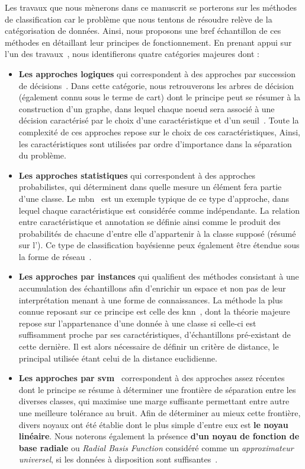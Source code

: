 Les travaux que nous mènerons dans ce manuscrit se porterons sur les méthodes de classification car le problème que nous tentons de résoudre relève de la catégorisation de données. Ainsi, nous proposons une bref échantillon de ces méthodes en détaillant leur principes de fonctionnement. En prenant appui sur l'un des travaux~\cite{Kotsiantis2007}, nous identifierons quatre catégories majeures dont :
\begin{itemize}
    \item \textbf{Les approches logiques} qui correspondent à des approches par succession de décisions~\cite{Kotsiantis2007}. Dans cette catégorie, nous retrouverons les arbres de décision~\cite{Breiman1984} (également connu sous le terme de \gls{cart}) dont le principe peut se résumer à la construction d'un graphe, dans lequel chaque noeud sera associé à une décision caractérisé par le choix d'une caractéristique et d'un seuil~\cite{Quinlan1986}. Toute la complexité de ces approches repose sur le choix de ces caractéristiques, Ainsi, les caractéristiques sont utilisées par ordre d'importance dans la séparation du problème.
    \item \textbf{Les approches statistiques} qui correspondent à des approches probabilistes, qui déterminent dans quelle mesure un élément fera partie d'une classe. Le \gls{mbn}~\cite{Zhang2004} est un exemple typique de ce type d'approche, dans lequel chaque caractéristique est considérée comme indépendante. La relation entre caractéristique et annotation se définie ainsi comme le produit des probabilités de chacune d'entre elle d'appartenir à la classe supposé (résumé sur l'). Ce type de classification bayésienne peux également être étendue sous la forme de réseau~\cite{Kononenko1989}.
    \item \textbf{Les approches par instances} qui qualifient des méthodes consistant à une accumulation des échantillons afin d'enrichir un espace et non pas de leur interprétation menant à une forme de connaissances. La méthode la plus connue reposant sur ce principe est celle des \gls{knn}~\cite{Cover1967}, dont la théorie majeure repose sur l'appartenance d'une donnée à une classe si celle-ci est suffisamment proche par ses caractéristiques, d'échantillons pré-existant de cette dernière. Il est alors nécessaire de définir un critère de distance, le principal utilisée étant  celui de la distance euclidienne. 
    \item \textbf{Les approches par \gls{svm}}~\cite{Cortes1995} correspondent à des approches assez récentes dont le principe se résume à déterminer une frontière de séparation entre les diverses classes, qui maximise une marge suffisante permettant entre autre une meilleure tolérance au bruit. Afin de déterminer au mieux cette frontière, divers noyaux ont été établie dont le plus simple d'entre eux est \textbf{le noyau linéaire}. Nous noterons également la présence \textbf{d'un noyau de fonction de base radiale} ou \textit{Radial Basis Function} considéré comme un \textit{approximateur universel}, si les données à disposition sont suffisantes~\cite{Wang2004}.  

\end{itemize}
